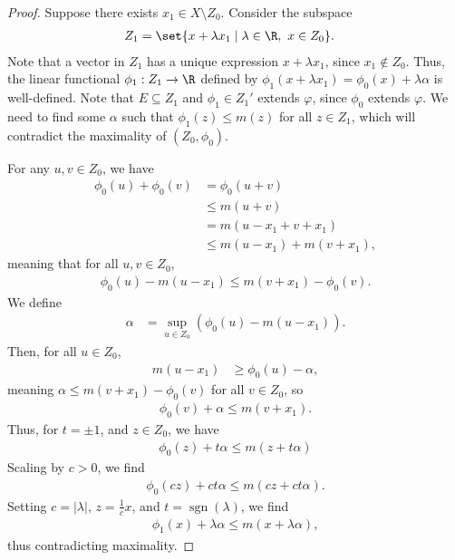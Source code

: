 \documentclass[10pt]{mypackage}
\begin{document}
\begin{proof}
    Suppose there exists $x_1\in X\setminus Z_0$. Consider the subspace
    \begin{align*}
      Z_1 &= \set{x + \lambda x_1\mid \lambda\in \R,~x\in Z_0}.
    \end{align*}
    Note that a vector in $Z_1$ has a unique expression $x + \lambda x_1$, since $x_1\notin Z_0$. Thus, the linear functional $\phi_1: Z_1\rightarrow \R$ defined by $\phi_1\left(x + \lambda x_1\right) = \phi_0\left(x\right) + \lambda \alpha$ is well-defined. Note that $E\subseteq Z_1$ and $\phi_1\in Z_1'$ extends $\varphi$, since $\phi_0$ extends $\varphi$. We need to find some $\alpha$ such that $\phi_1\left(z\right) \leq m(z)$ for all $z\in Z_1$, which will contradict the maximality of $\left(Z_0,\phi_0\right)$.\newline

    For any $u,v\in Z_0$, we have
    \begin{align*}
      \phi_0\left(u\right) + \phi_0\left(v\right) &= \phi_0(u+v)\\
                                                  &\leq m\left(u+v\right)\\
                                                  &= m\left(u-x_1 + v+x_1\right)\\
                                                  &\leq m\left(u-x_1\right) + m\left(v + x_1\right),
    \end{align*}
    meaning that for all $u,v\in Z_0$,
    \begin{align*}
      \phi_0\left(u\right) - m\left(u-x_1\right) \leq m\left(v + x_1\right) - \phi_0(v).
    \end{align*}
    We define
    \begin{align*}
      \alpha &= \sup_{u\in Z_0}\left(\phi_0\left(u\right) - m\left(u-x_1\right)\right).
    \end{align*}
    Then, for all $u\in Z_0$,
    \begin{align*}
      m\left(u-x_1\right) &\geq \phi_0\left(u\right) - \alpha,
    \end{align*}
    meaning $\alpha \leq m\left(v+x_1 \right) - \phi_0(v)$ for all $v\in Z_0$, so
    \begin{align*}
      \phi_0(v) + \alpha \leq m\left(v + x_1\right).
    \end{align*}
    Thus, for $t = \pm 1$, and $z\in Z_0$, we have
    \begin{align*}
      \phi_0(z) + t\alpha \leq m\left(z + t\alpha\right)
    \end{align*}
    Scaling by $c > 0$, we find
    \begin{align*}
      \phi_0\left(cz\right) + ct\alpha \leq m\left(cz + ct\alpha\right).
    \end{align*}
    Setting $c = |\lambda|$, $z = \frac{1}{c}x$, and $t = \operatorname{sgn}\left(\lambda\right)$, we find 
    \begin{align*}
      \phi_1\left(x\right) + \lambda\alpha \leq m\left(x + \lambda\alpha\right),
    \end{align*}
    thus contradicting maximality.
  \end{proof}
\end{document}

